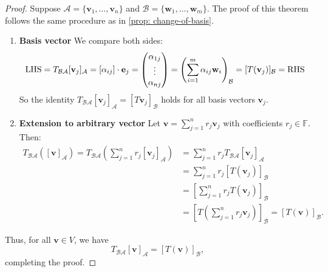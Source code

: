 \begin{proof}
Suppose \( \mathcal{A} = \{ \mathbf{v}_1, \dots, \mathbf{v}_n \} \) and \( \mathcal{B} = \{ \mathbf{w}_1, \dots, \mathbf{w}_m \} \). The proof of this theorem follows the same procedure as in \autoref{prop: change-of-basis}.

\begin{enumerate}
    \item \textbf{Basis vector} We compare both sides:
\begin{align*}
\text{LHS} = T_{\mathcal{B}\mathcal{A}} [{\bf v}_j]_{\mathcal{A}} = [\alpha_{ij}] \cdot \mathbf{e}_j = \begin{pmatrix} \alpha_{1j} \\ \vdots \\ \alpha_{nj} \end{pmatrix} = \left( \sum_{i=1}^{m} \alpha_{ij} \mathbf{w}_i \right)_{\mathcal{B}} = [T (\mathbf{v}_j)]_{\mathcal{B}} = \text{RHS} 
\end{align*}
So the identity \( T_{\mathcal{B}\mathcal{A}} [\mathbf{v}_j]_{\mathcal{A}} = [T\mathbf{v}_j]_{\mathcal{B}} \) holds for all basis vectors \( \mathbf{v}_j \).

\item \textbf{Extension to arbitrary vector}
Let \( \mathbf{v} = \sum_{j=1}^n r_j \mathbf{v}_j \) with coefficients \( r_j \in \mathbb{F} \). Then:
\begin{align*}
T_{\mathcal{B}\mathcal{A}}([\mathbf{v}]_{\mathcal{A}}) = T_{\mathcal{B}\mathcal{A}}\left( \sum_{j=1}^n r_j [\mathbf{v}_j]_{\mathcal{A}} \right) 
&= \sum_{j=1}^n r_j T_{\mathcal{B}\mathcal{A}}[\mathbf{v}_j]_{\mathcal{A}}  \\
&= \sum_{j=1}^n r_j [T (\mathbf{v}_j)]_{\mathcal{B}}  \\
&= \left[ \sum_{j=1}^n r_j T(\mathbf{v}_j)\right]_{\mathcal{B}}\\
&= [T(\sum_{j=1}^n r_j \mathbf{v}_j)]_{\mathcal{B}} = [T( \mathbf{v})]_{\mathcal{B}}.
\end{align*}
\end{enumerate}

Thus, for all \( \mathbf{v} \in V \), we have
\[
T_{\mathcal{B}\mathcal{A}} [\mathbf{v}]_{\mathcal{A}} = [T(\mathbf{v})]_{\mathcal{B}},
\]
completing the proof.
\end{proof}

